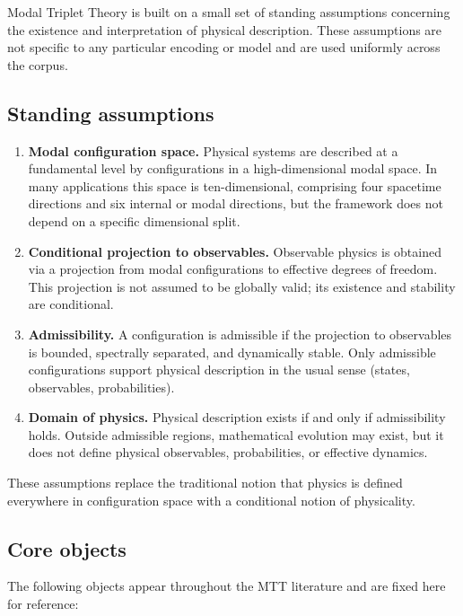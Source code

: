 \documentclass[11pt]{article}
\begin{document}
Modal Triplet Theory is built on a small set of standing assumptions concerning the existence and interpretation of physical description. These assumptions are not specific to any particular encoding or model and are used uniformly across the corpus.

\subsection{Standing assumptions}

\begin{enumerate}[label=\textbf{SA.\arabic*}]
\item \textbf{Modal configuration space.}  
Physical systems are described at a fundamental level by configurations in a high-dimensional modal space. In many applications this space is ten-dimensional, comprising four spacetime directions and six internal or modal directions, but the framework does not depend on a specific dimensional split.

\item \textbf{Conditional projection to observables.}  
Observable physics is obtained via a projection from modal configurations to effective degrees of freedom. This projection is not assumed to be globally valid; its existence and stability are conditional.

\item \textbf{Admissibility.}  
A configuration is admissible if the projection to observables is bounded, spectrally separated, and dynamically stable. Only admissible configurations support physical description in the usual sense (states, observables, probabilities).

\item \textbf{Domain of physics.}  
Physical description exists if and only if admissibility holds. Outside admissible regions, mathematical evolution may exist, but it does not define physical observables, probabilities, or effective dynamics.
\end{enumerate}

These assumptions replace the traditional notion that physics is defined everywhere in configuration space with a conditional notion of physicality.

\subsection{Core objects}

The following objects appear throughout the MTT literature and are fixed here for reference:
\end{document}
